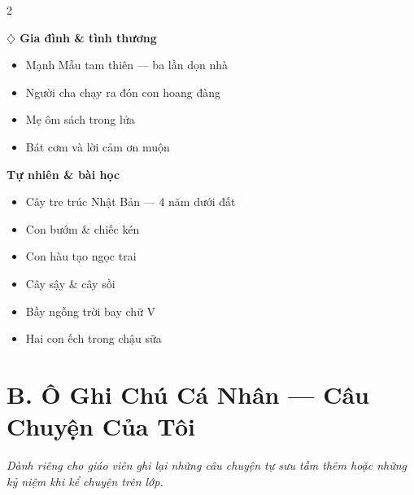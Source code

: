 \begin{multicols}{2}
\vspace{0.4cm}

\textbf{\color{truyenblue}$\diamondsuit$ Gia đình \& tình thương}
\begin{itemize}[noitemsep, leftmargin=1.2cm]
  \item Mạnh Mẫu tam thiên --- ba lần dọn nhà
  \item Người cha chạy ra đón con hoang đàng
  \item Mẹ ôm sách trong lửa
  \item Bát cơm và lời cảm ơn muộn
\end{itemize}

\vspace{0.4cm}

\textbf{\color{truyengreen}Tự nhiên \& bài học}
\begin{itemize}[noitemsep, leftmargin=1.2cm]
  \item Cây tre trúc Nhật Bản --- 4 năm dưới đất
  \item Con bướm \& chiếc kén
  \item Con hàu tạo ngọc trai
  \item Cây sậy \& cây sồi
  \item Bầy ngỗng trời bay chữ V
  \item Hai con ếch trong chậu sữa
\end{itemize}
\end{multicols}

\vspace{0.8cm}

\section*{B. Ô Ghi Chú Cá Nhân --- Câu Chuyện Của Tôi}

\textit{Dành riêng cho giáo viên ghi lại những câu chuyện tự sưu tầm thêm hoặc
những kỷ niệm khi kể chuyện trên lớp.}

\vspace{0.5cm}

\newcommand{\ghichu}{%
  \vspace{0.3cm}
  \begin{tcolorbox}[
    colback=white, colframe=boxborder!50,
    arc=4pt, boxrule=0.6pt,
    height=4.5cm,
    valign=top
  ]
    \textit{\small\color{gray} Tên câu chuyện: \hrulefill}\\[0.5cm]
    \textit{\small\color{gray} Nguồn: \hrulefill}\\[0.3cm]
    \textit{\small\color{gray} Ngày kể / lớp: \hrulefill}\\[0.3cm]
    \textit{\small\color{gray} Phản hồi của học sinh:}\\[0.5cm]
    \hrulefill\\[0.4cm]
    \hrulefill\\[0.4cm]
    \hrulefill
  \end{tcolorbox}
}

